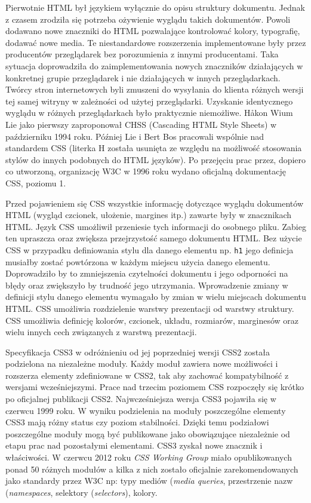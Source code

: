 Pierwotnie HTML był językiem wyłącznie do opisu struktury dokumentu. Jednak z czasem zrodziła się potrzeba ożywienie wyglądu takich dokumentów. Powoli dodawano nowe znaczniki do HTML pozwalające kontrolować kolory, typografię, dodawać nowe media. Te niestandardowe rozszerzenia implementowane były przez producentów przeglądarek bez porozumienia z innymi producentami. Taka sytuacja doprowadziła do zaimplementowania nowych znaczników działających w konkretnej grupie przeglądarek i nie działających w innych przeglądarkach. Twórcy stron internetowych byli zmuszeni do wysyłania do klienta różnych wersji tej samej witryny w zależności od użytej przeglądarki. Uzyskanie identycznego wyglądu w różnych przeglądarkach było praktycznie niemożliwe. Håkon Wium Lie jako pierwszy zaproponował CHSS (Cascading HTML Style Sheets) w październiku 1994 roku. Później Lie i Bert Bos pracowali wspólnie nad standardem CSS (literka H została usunięta ze względu na możliwość stosowania stylów do innych podobnych do HTML języków). Po przejęciu prac przez, dopiero co utworzoną, organizację W3C w 1996 roku wydano oficjalną dokumentację CSS, poziomu 1\cite{cssWiki}.

Przed pojawieniem się CSS wszystkie informację dotyczące wyglądu dokumentów HTML (wygląd czcionek, ułożenie, margines itp.) zawarte były w znacznikach HTML. Język CSS umożliwił przeniesie tych informacji do osobnego pliku. Zabieg ten upraszcza oraz zwiększa przejrzystość samego dokumentu HTML. Bez użycie CSS w przypadku definiowania stylu dla danego elementu np. \verb|h1| jego definicja musiałby zostać powtórzona w każdym miejscu użycia danego elementu. Doprowadziło by to zmniejszenia czytelności dokumentu i jego odporności na błędy oraz zwiększyło by trudność jego utrzymania. Wprowadzenie zmiany w definicji stylu danego elementu wymagało by zmian w wielu miejscach dokumentu HTML. CSS umożliwia rozdzielenie warstwy prezentacji od warstwy struktury. CSS umożliwia definicję kolorów, czcionek, układu, rozmiarów, marginesów oraz wielu innych cech związanych z warstwą prezentacji.

Specyfikacja CSS3 w odróżnieniu od jej poprzedniej wersji CSS2 została podzielona na niezależne moduły. Każdy moduł zawiera nowe możliwości i rozszerza elementy zdefiniowane w CSS2, tak aby zachować kompatybilność z wersjami wcześniejszymi. Prace nad trzecim poziomem CSS rozpoczęły się krótko po oficjalnej publikacji CSS2. Najwcześniejsza wersja CSS3 pojawiła się w czerwcu 1999 roku. W wyniku podzielenia na moduły poszczególne elementy CSS3 mają różny status czy poziom stabilności. Dzięki temu podziałowi poszczególne moduły mogą być publikowane jako obowiązujące niezależnie od etapu prac nad pozostałymi elementami. CSS3 zyskał nowe znacznik i właściwości. W czerwcu 2012 roku \emph{CSS Working Group} miało opublikowanych ponad 50 różnych modułów a kilka z nich zostało oficjalnie zarekomendowanych jako standardy przez W3C np: typy mediów (\textit{media queries}, przestrzenie nazw (\textit{namespaces}, selektory (\textit{selectors}), kolory\cite{cssWiki}.

